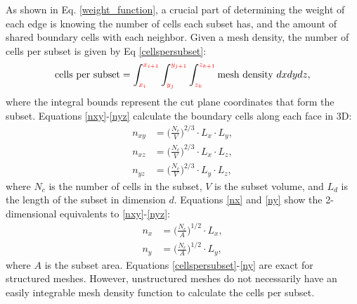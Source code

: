 As shown in Eq. \ref{weight_function}, a crucial part of determining the weight of each edge is knowing the number of cells each subset has, and the amount of shared boundary cells with each neighbor. Given a mesh density, the number of cells per subset is given by Eq \ref{cellspersubset}:
\begin{equation}
   \text{cells per subset} = \int_{\textcolor{red}{x_i}}^{\textcolor{red}{x_{i+1}}} \int_{\textcolor{red}{y_j}}^{\textcolor{red}{y_{j+1}}} \int_{\textcolor{red}{z_k}}^{\textcolor{red}{z_{k+1}}} \text{mesh density } dx dy dz,
\label{cellspersubset}
\end{equation}
where the integral bounds represent the cut plane coordinates that form the subset.
Equations \ref{nxy}-\ref{nyz} calculate the boundary cells along each face in 3D:
\begin{align}
n_{xy} &= \Big(\frac{N_c}{V}\Big)^{2/3}\cdot L_x\cdot L_y \label{nxy}, \\
n_{xz} &= \Big(\frac{N_c}{V}\Big)^{2/3}\cdot L_x\cdot L_z \label{nxz}, \\
n_{yz} &= \Big(\frac{N_c}{V}\Big)^{2/3}\cdot L_y\cdot L_z \label{nyz},
\end{align}
where $N_c$ is the number of cells in the subset, $V$ is the subset volume, and $L_d$ is the length of the subset in dimension $d$.
Equations \ref{nx} and \ref{ny} show the 2-dimensional equivalents to \ref{nxy}-\ref{nyz}:
\begin{align}
n_x &= \Big(\frac{N_c}{A}\Big)^{1/2}\cdot L_x, \label{nx} \\
n_y &= \Big(\frac{N_c}{A}\Big)^{1/2}\cdot L_y, \label{ny}
\end{align}
where $A$ is the subset area. Equations \ref{cellspersubset}-\ref{ny} are exact for structured meshes.
However, unstructured meshes do not necessarily have an easily integrable mesh density function to calculate the cells per subset.

